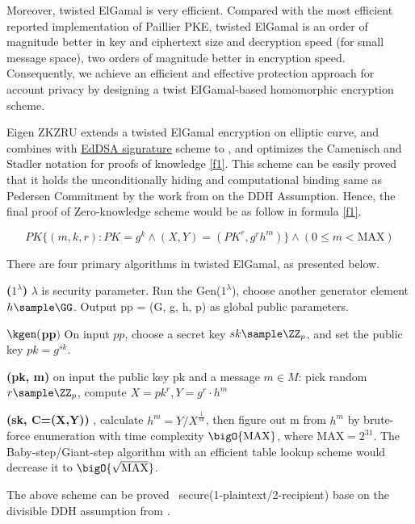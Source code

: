 \documentclass{article}
\begin{document}
Moreover, twisted ElGamal is very efficient. Compared with the most efficient reported implementation of Paillier PKE, twisted ElGamal is an order of magnitude better in key and ciphertext size and decryption speed (for small message space), two orders of magnitude better in encryption speed. Consequently, we achieve an efficient and effective protection approach for account privacy by designing a twist EIGamal-based homomorphic encryption scheme.

Eigen ZKZRU extends a twisted ElGamal encryption on elliptic curve, and combines with \href{https://datatracker.ietf.org/doc/html/rfc8032}{EdDSA signrature} scheme to , and optimizes the Camenisch and Stadler \cite{camenisch1997efficient} notation for proofs of knowledge \ref{f1}. This scheme can be easily proved that it holds the unconditionally hiding and computational binding same as Pedersen Commitment by the work from \cite{bunz2020zether,chen2020pgc} on the DDH Assumption. Hence, the final proof of Zero-knowledge scheme would be as follow in formula \ref{f1}.

\begin{equation}
 PK\{(m, k, r): PK = g^k \land (X, Y) = (PK^{r}, g^r h^m)\} \land (0 \leq m < \mbox{MAX}) \label{f1}  
\end{equation}

There are four primary algorithms in twisted ElGamal, as presented below.

\textbf{\pgen($1^\lambda$)} $\lambda$ is security parameter.  Run the Gen($1^\lambda$), choose another generator element $h \sample \GG$. Output pp = (G, g, h, p) as global public parameters.

\textbf{$\kgen($pp$)$} On input $pp$, choose a secret key $sk \sample \ZZ_p$, and set the public key $pk = g^{sk}$.

\textbf{\enc(pk, m)} on input the public key pk and a message $m \in  M$: pick random $r \sample \ZZ_p$, compute $X=pk^r, Y = g^r \cdot h^m$

\textbf{\dec(sk, C=(X,Y))} , calculate $h^m = {Y}/{X^{\frac{1}{sk}}}$,  then figure out m from $h^m$ by brute-force enumeration with time complexity $\bigO{\mbox{MAX}}$, where $\mbox{MAX}=2^{31}$. The Baby-step/Giant-step algorithm \cite{Shanks1971ClassNA} with an efficient table lookup scheme would decrease it to $\bigO{\sqrt{\mbox{MAX}}}$.

The above scheme can be proved \indcpa\ secure(1-plaintext/2-recipient) base on the divisible DDH assumption from \cite{chen2020pgc}.
\end{document}
